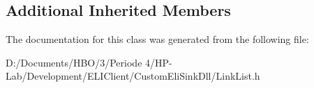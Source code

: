 \subsection*{Additional Inherited Members}


The documentation for this class was generated from the following file\+:\begin{DoxyCompactItemize}
\item 
D\+:/\+Documents/\+H\+B\+O/3/\+Periode 4/\+H\+P-\/\+Lab/\+Development/\+E\+L\+I\+Client/\+Custom\+Eli\+Sink\+Dll/Link\+List.\+h\end{DoxyCompactItemize}
